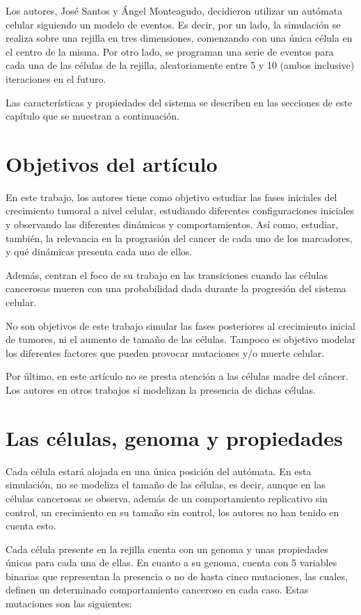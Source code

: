 Los autores, José Santos y Ángel Monteagudo, decidieron utilizar un autómata celular
siguiendo un modelo de eventos. Es decir, por un lado, la simulación se realiza
sobre una rejilla en tres dimensiones, comenzando con una única célula en el centro de la misma.
Por otro lado, se programan una serie de eventos para cada una de las células de la rejilla, aleatoriamente
entre 5 y 10 (ambos inclusive) iteraciones en el futuro.

Las características y propiedades del sistema se describen en las secciones de este capítulo que
se muestran a continuación.

\section{Objetivos del artículo}

En este trabajo, los autores tiene como objetivo estudiar las fases iniciales del crecimiento tumoral a nivel celular,
estudiando diferentes configuraciones iniciales y observando las diferentes dinámicas y comportamientos. Así como,
estudiar, también, la relevancia en la prograsión del cancer de cada uno de los marcadores, y qué
dinámicas presenta cada uno de ellos.

Además, centran el foco de su trabajo en las transiciones cuando las células cancerosas
mueren con una probabilidad dada durante la progresión del sistema celular.

No son objetivos de este trabajo simular las fases posteriores al crecimiento inicial de tumores, ni el
aumento de tamaño de las células. Tampoco es objetivo modelar los diferentes factores que
pueden provocar mutaciones y/o muerte celular.

Por último, en este artículo no se presta atención a las células madre del cáncer. Los autores en
otros trabajos \cite{jsantos-amonteagudo-2015} sí modelizan la presencia de dichas células.

\section{Las células, genoma y propiedades}

Cada célula estará alojada en una única posición del autómata. En esta simulación, no se modeliza
el tamaño de las células, es decir, aunque en las células cancerosas se observa, además de un comportamiento
replicativo sin control, un crecimiento en su tamaño sin control, los autores no han tenido en cuenta esto.

Cada célula presente en la rejilla cuenta con un genoma y unas propiedades únicas para cada una de ellas.
En cuanto a su genoma, cuenta con 5 variables binarias que representan la presencia o no de hasta cinco mutaciones, las cuales, definen
un determinado comportamiento canceroso en cada caso. Estas mutaciones son las siguientes:

